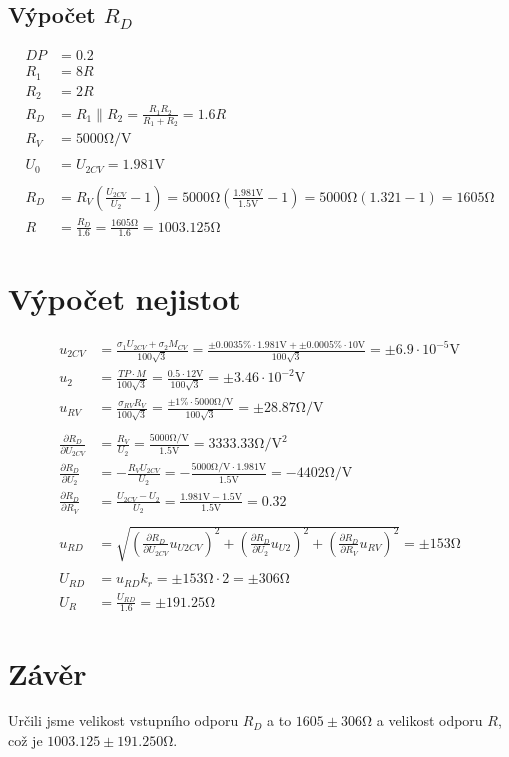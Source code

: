 \documentclass{article}
\begin{document}
	\subsection{Výpočet $R_D$}
	$$
	\begin{aligned}
		DP &= 0.2 \\
		R_1 &= 8R \\
		R_2 &= 2R \\
		R_D &= R_1 \parallel R_2 = \frac{R_1 R_2}{R_1 + R_2} = 1.6 R \\
		R_V &= 5000 \si{\ohm\per\volt} \\
		\\
		U_0 &= U_{2CV} = 1.981 \si{\volt} \\
		\\
		R_D &= R_V (\frac{U_{2CV}}{U_2}-1)=5000\si{\ohm}(\frac{1.981 \si{\volt}}{1.5 \si{\volt}}-1) = 5000 \si{\ohm} (1.321-1)=1605 \si{\ohm}\\
		R &= \frac{R_D}{1.6} = \frac{1605 \si{\ohm}}{1.6} = 1003.125 \si{\ohm}
	\end{aligned}
	$$
	
	\section{Výpočet nejistot}
	$$
	\begin{aligned}
		u_{2CV} &= \frac{\sigma_1 U_{2CV} + \sigma_2 M_{CV}}{100 \sqrt{3}} = \frac{\pm 0.0035 \% \cdot 1.981 \si{\volt} + \pm 0.0005 \% \cdot 10 \si{\volt}}{100 \sqrt{3}} = \pm 6.9 \cdot 10^{-5} \si{\volt} \\
		u_2 &= \frac{TP \cdot M}{100 \sqrt{3}} = \frac{0.5 \cdot 12 \si{\volt}}{100 \sqrt{3}} = \pm3.46 \cdot 10^{-2} \si{\volt} \\
		u_{RV} &= \frac{\sigma_{RV} R_V}{100 \sqrt{3}} = \frac{\pm 1 \% \cdot 5000 \si{\ohm\per\volt}}{100 \sqrt{3}} = \pm 28.87 \si{\ohm\per\volt} \\
		\\
		\frac{\partial R_D}{\partial U_{2CV}} &= \frac{R_V}{U_2} = \frac{5000 \si{\ohm\per\volt}}{1.5 \si{\volt}} = 3333.33 \si{\ohm\per\volt\squared} \\
		\frac{\partial R_D}{\partial U_2} &= -\frac{R_V U_{2CV}}{U_2} = -\frac{5000 \si{\ohm\per\volt} \cdot 1.981 \si{\volt}}{1.5 \si{\volt}} = -4402 \si{\ohm\per\volt} \\
		\frac{\partial R_D}{\partial R_V} &= \frac{U_{2CV} - U_2}{U_2} = \frac{1.981 \si{\volt} - 1.5 \si{\volt}}{1.5 \si{\volt}} = 0.32 \\
		\\
		u_{RD} &= \sqrt{(\frac{\partial R_D}{\partial U_{2CV}}u_{U2CV})^2+(\frac{\partial R_D}{\partial U_{2}}u_{U2})^2+(\frac{\partial R_D}{\partial R_{V}}u_{RV})^2} = \pm 153 \si{\ohm} \\
		\\
		U_{RD} &= u_{RD} k_r = \pm 153 \si{\ohm} \cdot 2 = \pm 306 \si{\ohm} \\
		U_{R} &= \frac{U_{RD}}{1.6} = \pm 191.25 \si{\ohm}
	\end{aligned}
	$$
	
	\section{Závěr}
	Určili jsme velikost vstupního odporu $R_D$ a to $1605 \pm 306 \si{\ohm}$ a velikost odporu $R$, což je $1003.125 \pm 191.250 \si{\ohm}$.
	
\end{document}
